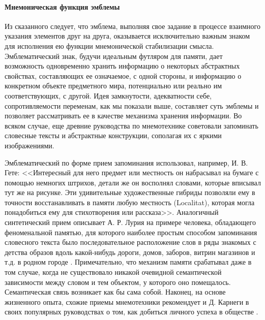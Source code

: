 \paragraph{Мнемоническая функция эмблемы}

Из сказанного следует, что эмблема, выполняя свое задание в процессе взаимного указания элементов
друг на друга, оказывается исключительно важным знаком для исполнения ею функции мнемонической
стабилизации смысла. Эмблематический знак, будучи идеальным футляром для памяти, дает возможность
одновременно хранить информацию о некоторых абстрактных свойствах, составляющих ее означаемое, с
одной стороны, и информацию о конкретном объекте предметного мира, потенциально или реально им
соответствующих, с другой. Идея замкнутости, адекватности себе, сопротивляемости переменам, как мы
показали выше, составляет суть эмблемы и позволяет рассматривать ее в качестве механизма хранения
информации. Во всяком случае, еще древние руководства по мнемотехнике советовали запоминать
словесные тексты и абстрактные конструкции, сополагая их с яркими изображениями\autocite[][49]{grigoreva2005}.

Эмблематический по форме прием запоминания использовал, например, И. В. Гете: <<Интересный для него
предмет или местность он набрасывал на бумаге с помощью немногих штрихов, детали же он восполнял
словами, которые вписывал тут же на рисунке. Эти удивительные художественные гибриды позволяли ему в
точности восстанавливать в памяти любую местность (Localitat), которая могла понадобиться ему для
стихотворения или рассказа>>\autocite[][219]{bahtin1979}. Аналогичный
синтетический прием описывает А. Р. Лурия на примере человека, обладающего феноменальной памятью,
для которого наиболее простым способом запоминания словесного текста было последовательное
расположение слов в ряды знакомых с детства образов вдоль какой-нибудь дороги, домов, заборов,
витрин магазинов и т.д. в родном городе \autocite[]{luria1979}.
Примечательно, что механизм памяти срабатывал даже в том случае, когда не
существовало никакой очевидной семантической зависимости между словом и тем объектом, у которого оно
помещалось. Семантическая связь возникает как бы сама собой. Наконец, на основе жизненного опыта,
схожие приемы мнемотехники рекомендует и Д. Карнеги в своих популярных руководствах о том, как
добиться личного успеха в обществе \autocite[][237--420]{karnegi1996}.

